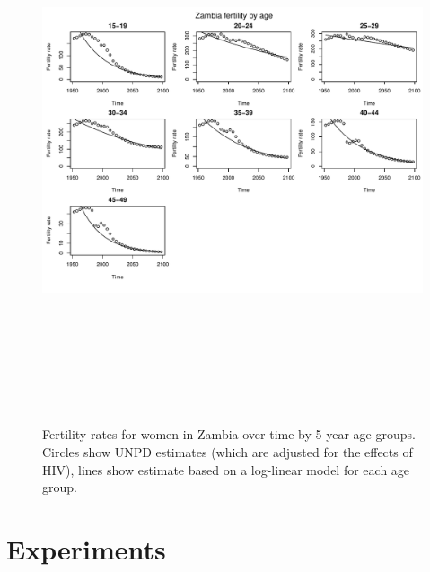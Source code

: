\documentclass{article}
\begin{document}
\begin{figure}
\includegraphics[width=16cm,height=16cm]{EstimatingRatesFromUNPD-FertilityZam} 

\caption{Fertility rates for women in Zambia over time by 5 year age groups. Circles show UNPD estimates (which are adjusted for the effects of HIV), lines show estimate based on a log-linear model for each age group.}
\label{FertilityZam}
\end{figure}



\clearpage
\section*{Experiments}
\end{document}
